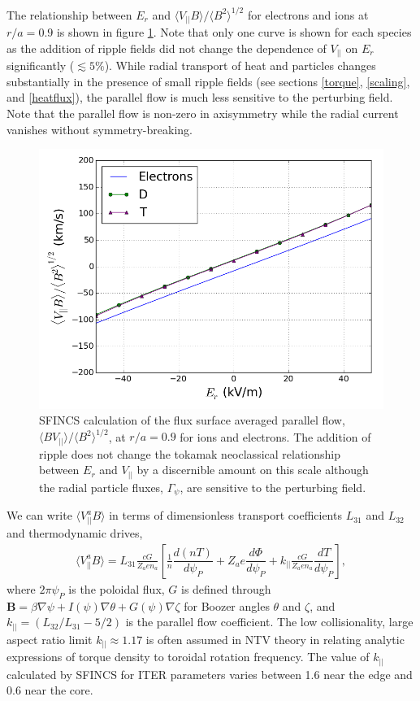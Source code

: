 \documentclass[aip, pop, preprint]{revtex4-1}
\numberwithin{figure}{section}
\numberwithin{equation}{section}
\newcommand{\der}[2]{\dfrac{d #1}{d  #2}}
\begin{document}
The relationship between $E_r$ and $\langle V_{||} B \rangle/\langle B^2 \rangle^{1/2}$ for electrons and ions at $r/a = 0.9$ is shown in figure \ref{fig:Er_flow}. Note that only one curve is shown for each species as the addition of ripple fields did not change the dependence of $V_{||}$ on $E_r$ significantly ($\lesssim 5 \%$). While radial transport of heat and particles changes substantially in the presence of small ripple fields (see sections \ref{torque}, \ref{scaling}, and \ref{heatflux}), the parallel flow is much less sensitive to the perturbing field. Note that the parallel flow is non-zero in axisymmetry while the radial current vanishes without symmetry-breaking. 

\begin{figure}[h!]
\centering
\includegraphics[width=.7\textwidth]{Er_flow.png}
\caption{\label{fig:Er_flow} SFINCS calculation of the flux surface averaged parallel flow, $\langle B V_{||} \rangle/\langle B^2 \rangle^{1/2}$, at $r/a = 0.9$ for ions and electrons. The addition of ripple does not change the tokamak neoclassical relationship between $E_r$ and $V_{||}$ by a discernible amount on this scale although the radial particle fluxes, $\Gamma_{\psi}$, are sensitive to the perturbing field.}
\end{figure}

We can write $\langle V_{||}^a B \rangle$ in terms of dimensionless transport coefficients $L_{31}$ and $L_{32}$ and thermodynamic drives,
\begin{gather}
\langle  V_{||}^a  B\rangle = L_{31} \frac{c G}{Z_a e n_a} \left[ \frac{1}{n} \der{(nT)}{\psi_P} + Z_a e \der{\Phi}{\psi_P}  + k_{||} \frac{cG}{Z_a e n_a} \der{T}{\psi_P} \right],
\end{gather}
where $2 \pi \psi_P$ is the poloidal flux,  $G$ is defined through $\bm{B} = \beta \nabla \psi + I(\psi) \nabla \theta + G(\psi) \nabla \zeta$ for Boozer angles $\theta$ and $\zeta$, and $k_{||} = (L_{32}/L_{31} - 5/2)$ is the parallel flow coefficient. The low collisionality, large aspect ratio limit\cite{Hinton1976, Hirshman1981} $k_{||} \approx 1.17$ is often assumed in NTV theory\cite{Callen2011, Sun2011} in relating analytic expressions of torque density to toroidal rotation frequency. The value of $k_{||}$ calculated by SFINCS for ITER parameters varies between 1.6 near the edge and 0.6 near the core. 
\end{document}
